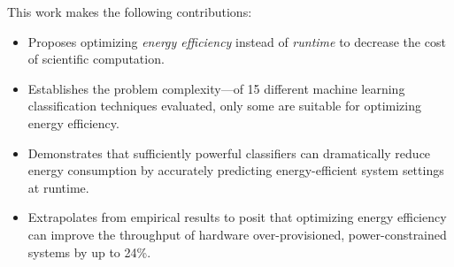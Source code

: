 This work makes the following contributions:
\begin{itemize}
\item Proposes optimizing \emph{energy efficiency} instead of \emph{runtime} to decrease the cost of scientific computation.
\item Establishes the problem complexity---of 15 different machine learning classification techniques evaluated, only some are suitable for optimizing energy efficiency.
\item Demonstrates that sufficiently powerful classifiers can dramatically reduce energy consumption by accurately predicting energy-efficient system settings at runtime.
\item Extrapolates from empirical results to posit that optimizing energy efficiency can improve the throughput of hardware over-provisioned, power-constrained systems by up to 24\%.
\end{itemize}
